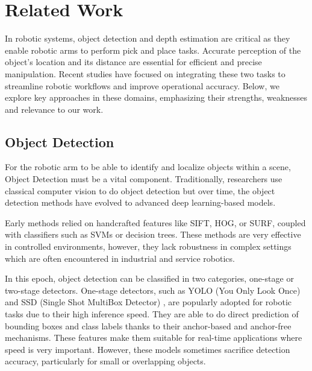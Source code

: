 \section{Related Work}
In robotic systems, object detection and depth estimation are critical as they enable robotic arms to perform pick and place tasks. Accurate perception of the object’s location and its distance are essential for efficient and precise manipulation. Recent studies have focused on integrating these two tasks to streamline robotic workflows and improve operational accuracy.
Below, we explore key approaches in these domains, emphasizing their strengths, weaknesses and relevance to our work.

\vspace{10pt}

\subsection{Object Detection}
For the robotic arm to be able to identify and localize objects within a scene, Object Detection must be a vital component. Traditionally, researchers use classical computer vision to do object detection but over time, the object detection methods have evolved to advanced deep learning-based models.

\vspace{10pt}

Early methods relied on handcrafted features like SIFT, HOG, or SURF, coupled with classifiers such as SVMs or decision trees. These methods are very effective in controlled environments, however, they lack robustness in complex settings which are often encountered in industrial and service robotics.

\vspace{10}

In this epoch, object detection can be classified in two categories, one-stage or two-stage detectors. One-stage detectors, such as YOLO (You Only Look Once) \cite{redmon2018yolov3:anincrementalimprovement} and SSD (Single Shot MultiBox Detector) \cite{liu2016ssd:singleshotmultiboxdetector}, are popularly adopted for robotic tasks due to their high inference speed. They are able to do direct prediction of bounding boxes and class labels thanks to their anchor-based and anchor-free mechanisms. These features make them suitable for real-time applications where speed is very important. However, these models sometimes sacrifice detection accuracy, particularly for small or overlapping objects.

